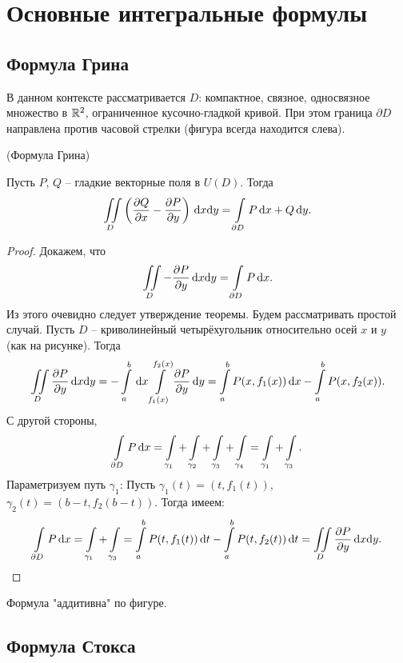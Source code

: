 \chapter{Основные интегральные формулы}
\section{Формула Грина}

\begin{remark}
     В данном контексте рассматривается $D$: компактное, связное,
     односвязное множество в $\mathbb{R}^2$, ограниченное кусочно-гладкой кривой.
     При этом граница $\partial D$ направлена против часовой стрелки 
     (фигура всегда находится слева).
\end{remark}

\begin{theorem}(Формула Грина)

    Пусть $P$, $Q$ -- гладкие векторные поля в $U(D)$. Тогда
\[
    \iint\limits_{D}{\left( \dfrac{\partial Q}{\partial x} - \dfrac{\partial P}{\partial y} \right) \,\mathrm{d} x \mathrm{d} y}
    = \int\limits_{\partial D}{P \,\mathrm{d} x + Q \,\mathrm{d} y}
.\] 
\end{theorem}
\begin{proof}
    Докажем, что 
    \[
        \iint\limits_D{-\dfrac{\partial P}{\partial y} \,\mathrm{d} x \mathrm{d} y} = \int\limits_{\partial D}{P \,\mathrm{d} x}
    .\]
    Из этого очевидно следует утверждение теоремы.
    Будем рассматривать простой случай. Пусть $D$ -- криволинейный четырёхугольник относительно
    осей $x$ и $y$ (как на рисунке). Тогда
    \[
        \iint\limits_D{\dfrac{\partial P}{\partial y} \,\mathrm{d} x \mathrm{d} y} = -\int\limits_a^b{\,\mathrm{d} x \int\limits_{f_1(x)}^{f_2(x)}
        {\dfrac{\partial P}{\partial y} \,\mathrm{d} y}} = \int\limits_a^b{P(x, f_1(x)) \,\mathrm{d} x} - \int\limits_a^b{P(x, f_2(x))}
    .\]
    С другой стороны,
    \[
        \int\limits_{\partial D}{P \,\mathrm{d} x} = \int\limits_{\gamma_1} + \int\limits_{\gamma_2} + \int\limits_{\gamma_3}
        + \int\limits_{\gamma_4} = \int\limits_{\gamma_1} + \int\limits_{\gamma_3}
    .\]
    Параметризуем путь $\gamma_1$: Пусть $\gamma_1(t) = (t, f_1(t))$, $\gamma_2(t) = (b - t, f_2(b - t))$.
    Тогда имеем:
    \[
        \int\limits_{\partial D}{P \,\mathrm{d} x} = \int\limits_{\gamma_1} + \int\limits_{\gamma_3} =
        \int\limits_a^b{P(t, f_1(t)) \,\mathrm{d} t} - \int\limits_a^b{P(t, f_2(t)) \,\mathrm{d} t} =
        \iint\limits_{D}{\dfrac{\partial P}{\partial y} \,\mathrm{d} x \mathrm{d} y}
    .\]
\end{proof}

\begin{remark}
    Формула "аддитивна" по фигуре.
\end{remark}

\section{Формула Стокса}

